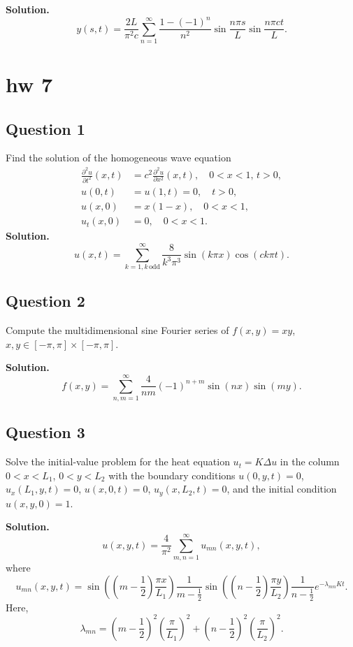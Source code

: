 \documentclass[lang=en,11pt]{template}
\begin{document}
\textbf{Solution.}
\[
y(s,t) = \frac{2L}{\pi^2 c} \sum_{n=1}^{\infty} \frac{1 - (-1)^n}{n^2} \sin \frac{n \pi s}{L} \sin \frac{n \pi c t}{L}.
\]











\chapter{hw 7}
\section*{Question 1}
Find the solution of the homogeneous wave equation
\[
\begin{aligned}
\frac{\partial^2 u}{\partial t^2} (x, t) &= c^2 \frac{\partial^2 u}{\partial x^2} (x, t), \quad 0 < x < 1, \, t > 0, \\
u(0,t) &= u(1,t) = 0, \quad t > 0, \\
u(x,0) &= x(1 - x), \quad 0 < x < 1, \\
u_t(x,0) &= 0, \quad 0 < x < 1.
\end{aligned}
\]
\textbf{Solution.} 
\[
u(x,t) = \sum_{k=1, k \, \text{odd}}^{\infty} \frac{8}{k^3 \pi^3} \sin(k\pi x) \cos(ck\pi t).
\]

\section*{Question 2}
Compute the multidimensional sine Fourier series of $f(x, y) = xy$, $x, y \in [-\pi, \pi] \times [-\pi, \pi]$.

\textbf{Solution.} 
\[
f(x,y) = \sum_{n,m=1}^{\infty} \frac{4}{nm} (-1)^{n+m} \sin(nx) \sin(my).
\]

\section*{Question 3}
Solve the initial-value problem for the heat equation $u_t = K \Delta u$ in the column $0 < x < L_1$, $0 < y < L_2$ with the boundary conditions $u(0,y,t) = 0$, $u_x(L_1,y,t) = 0$, $u(x,0,t) = 0$, $u_y(x,L_2,t) = 0$, and the initial condition $u(x,y,0) = 1$.

\textbf{Solution.} 
\[
u(x,y,t) = \frac{4}{\pi^2} \sum_{m,n=1}^{\infty} u_{mn}(x,y,t),
\]
where
\[
u_{mn}(x,y,t) = \sin\left( \left( m - \frac{1}{2} \right) \frac{\pi x}{L_1} \right) \frac{1}{m - \frac{1}{2}} \sin\left( \left( n - \frac{1}{2} \right) \frac{\pi y}{L_2} \right) \frac{1}{n - \frac{1}{2}} e^{-\lambda_{mn} K t}.
\]
Here,
\[
\lambda_{mn} = \left( m - \frac{1}{2} \right)^2 \left( \frac{\pi}{L_1} \right)^2 + \left( n - \frac{1}{2} \right)^2 \left( \frac{\pi}{L_2} \right)^2.
\]
\end{document}
